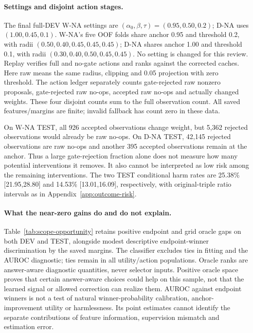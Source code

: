 \documentclass[11pt,a4paper]{article}
\begin{document}
\paragraph{Settings and disjoint action stages.}
The final full-DEV W-NA settings are $(\alpha_0,\beta,\tau)=(0.95,0.50,0.2)$; D-NA uses $(1.00,0.45,0.1)$. W-NA's five OOF folds share anchor 0.95 and threshold 0.2, with radii $(0.50,0.40,0.45,0.45,0.45)$; D-NA shares anchor 1.00 and threshold 0.1, with radii $(0.30,0.40,0.50,0.45,0.45)$. No setting is changed for this review. Replay verifies full and no-gate actions and ranks against the corrected caches. Here raw means the same radius, clipping and 0.05 projection with zero threshold. The action ledger separately counts gate-rejected raw nonzero proposals, gate-rejected raw no-ops, accepted raw no-ops and actually changed weights. These four disjoint counts sum to the full observation count. All saved features/margins are finite; invalid fallback has count zero in these data.

On W-NA TEST, all 926 accepted observations change weight, but 5,362 rejected observations would already be raw no-ops. On D-NA TEST, 42,145 rejected observations are raw no-ops and another 395 accepted observations remain at the anchor. Thus a large gate-rejection fraction alone does not measure how many potential interventions it removes. It also cannot be interpreted as low risk among the remaining interventions. The two TEST conditional harm rates are 25.38\% [21.95,28.80] and 14.53\% [13.01,16.09], respectively, with original-triple ratio intervals as in Appendix~\ref{app:outcome-risk}.


\FloatBarrier

\paragraph{What the near-zero gains do and do not explain.}
Table~\ref{tab:scope-opportunity} retains positive endpoint and grid oracle gaps on both DEV and TEST, alongside modest descriptive endpoint-winner discrimination by the saved margins. The classifier excludes ties in fitting and the AUROC diagnostic; ties remain in all utility/action populations. Oracle ranks are answer-aware diagnostic quantities, never selector inputs. Positive oracle space proves that certain answer-aware choices could help on this sample, not that the learned signal or allowed correction can realize them. AUROC against endpoint winners is not a test of natural winner-probability calibration, anchor-improvement utility or harmlessness. Its point estimates cannot identify the separate contributions of feature information, supervision mismatch and estimation error.
\end{document}
